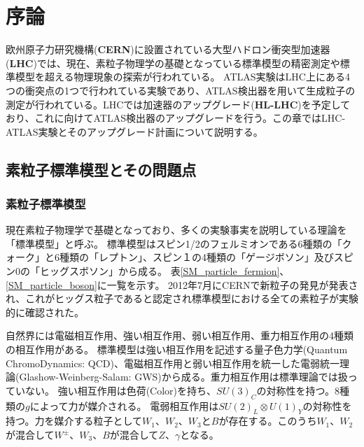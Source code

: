 \chapter{序論}
欧州原子力研究機構(\textbf{CERN})に設置されている大型ハドロン衝突型加速器(\textbf{LHC})では、現在、素粒子物理学の基礎となっている標準模型の精密測定や標準模型を超える物理現象の探索が行われている。
ATLAS実験はLHC上にある4つの衝突点の1つで行われている実験であり、ATLAS検出器を用いて生成粒子の測定が行われている。LHCでは加速器のアップグレード(\textbf{HL-LHC})を予定しており、これに向けてATLAS検出器のアップグレードを行う。この章ではLHC-ATLAS実験とそのアップグレード計画について説明する。

\section{素粒子標準模型とその問題点}
\subsection{素粒子標準模型}
現在素粒子物理学で基礎となっており、多くの実験事実を説明している理論を「標準模型」\cite{1-9}と呼ぶ。
標準模型はスピン1/2のフェルミオンである6種類の「クォーク」と6種類の「レプトン」、スピン１の4種類の「ゲージボソン」及びスピン0の「ヒッグスボソン」から成る。
表\ref{SM_particle_fermion}、\ref{SM_particle_boson}に一覧を示す。
2012年7月にCERNで新粒子の発見が発表され、これがヒッグス粒子であると認定され標準模型における全ての素粒子が実験的に確認された。

自然界には電磁相互作用、強い相互作用、弱い相互作用、重力相互作用の4種類の相互作用がある。
標準模型は強い相互作用を記述する量子色力学(Quantum ChromoDynamics: QCD)、電磁相互作用と弱い相互作用を統一した電弱統一理論(Glashow-Weinberg-Salam: GWS)から成る。重力相互作用は標準理論では扱っていない。
強い相互作用は色荷(Color)を持ち、$SU(3)_C$の対称性を持つ。8種類の$g$によって力が媒介される。
電弱相互作用は$SU(2)_L \otimes U(1)_Y$の対称性を持つ。力を媒介する粒子として$W_1$、$W_2$、$W_3$と$B$が存在する。このうち$W_1、W_2$が混合して$W^{\pm}、W_3、B$が混合して$Z、\gamma$となる。

